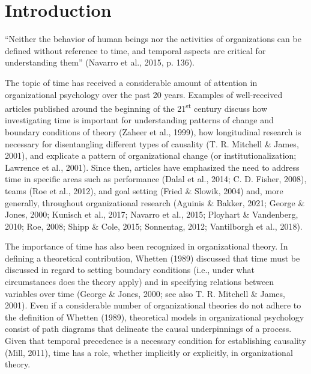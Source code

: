 \documentclass[
12pt, %
twoside,
english]{guelphthesis}
\newcommand{\setMainMatterLinespacing}{
 \setstretch{2} %

        \setstretch{2}
  }
\let\oldmainmatter\mainmatter
\renewcommand{\mainmatter}{
  \oldmainmatter

  \setMainMatterLinespacing

      \linenumbers
  
  \pagestyle{mainmatter} %

}
\newcommand{\listappname}{List of Appendices}
\theoremstyle{definition}
\theoremstyle{definition}
\theoremstyle{definition}
\theoremstyle{definition}
\theoremstyle{remark}
\begin{document}
  \listoftables
  \newpage

  \listoffigures
  \newpage

  \addcontentsline{toc}{chapter}{\listappname}
  \listofapp
  \newpage

\mainmatter %

\hypertarget{introduction}{%
\chapter{Introduction}\label{introduction}}

``Neither the behavior of human beings nor the activities of organizations can be defined without reference to time, and temporal aspects are critical for understanding them'' (Navarro et al., 2015, p. 136).

The topic of time has received a considerable amount of
attention in organizational psychology over the past 20 years. Examples
of well-received articles published around the beginning of the 21\textsuperscript{st}
century discuss how investigating time is important for
understanding patterns of change and boundary conditions of theory
(Zaheer et al., 1999), how longitudinal research is necessary for disentangling
different types of causality (T. R. Mitchell \& James, 2001), and explicate a pattern
of organizational change (or institutionalization; Lawrence et al., 2001).
Since then, articles have emphasized the need to address time in
specific areas such as performance (Dalal et al., 2014; C. D. Fisher, 2008), teams (Roe et al., 2012), and goal setting (Fried \& Slowik, 2004) and, more generally, throughout organizational research (Aguinis \& Bakker, 2021; George \& Jones, 2000; Kunisch et al., 2017; Navarro et al., 2015; Ployhart \& Vandenberg, 2010; Roe, 2008; Shipp \& Cole, 2015; Sonnentag, 2012; Vantilborgh et al., 2018).

The importance of time has also been recognized in organizational theory. In defining a theoretical contribution, Whetten (1989) discussed that time must be discussed in regard to setting boundary conditions (i.e., under what circumstances does the theory apply) and in specifying relations between variables over time (George \& Jones, 2000; see also T. R. Mitchell \& James, 2001). Even if a considerable number of organizational theories do not adhere to the definition of Whetten (1989), theoretical models in organizational psychology consist of path diagrams that delineate the causal underpinnings of a process. Given that temporal precedence is a necessary condition for establishing causality (Mill, 2011), time has a role, whether implicitly or explicitly, in organizational theory.
\end{document}
